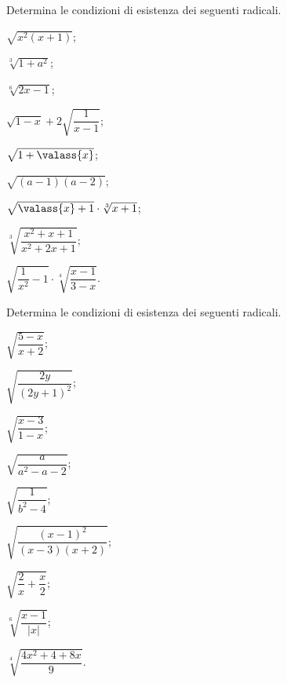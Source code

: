 \begin{esercizio}[\Ast]
 \label{ese:2.12}
Determina le condizioni di esistenza dei seguenti radicali.
 \begin{multicols}{3}
 \begin{enumeratea}
 \item $\sqrt{x^2(x+1)}$;
 \item $\sqrt[3]{1+a^2}$;
 \item $\sqrt[6]{2x-1}$;
 \item $\sqrt{1-x}+2\sqrt{\dfrac 1{x-1}}$;
 \item $\sqrt{1+\valass{x}}$;
 \item $\sqrt{(a-1)(a-2)}$;
 \item $\sqrt{\valass{x}+1}\cdot \sqrt[3]{x+1}$;
 \item $\sqrt[3]{\dfrac{x^2+x+1}{x^2+2x+1}}$;
 \item $\sqrt{\dfrac 1{x^2}-1}\cdot \sqrt[4]{\dfrac{x-1}{3-x}}$.
 \end{enumeratea}
 \end{multicols}
\end{esercizio}

\begin{esercizio}[\Ast]
 \label{ese:2.13}
Determina le condizioni di esistenza dei seguenti radicali.
 \begin{multicols}{3}
 \begin{enumeratea}
 \item $\sqrt{\dfrac{5-x}{x+2}}$;
 \item $\sqrt{\dfrac{2y}{(2y+1)^2}}$;
 \item $\sqrt{\dfrac{x-3}{1-x}}$;
 \item $\sqrt{\dfrac a{a^2-a-2}}$;
 \item $\sqrt{\dfrac 1{b^2-4}}$;
 \item $\sqrt{\dfrac{(x-1)^2}{(x-3)(x+2)}}$;
 \item $\sqrt{\dfrac 2 x+\dfrac x 2}$;
 \item $\sqrt[6]{\dfrac{x-1}{\left|x\right|}}$;
 \item $\sqrt[4]{\dfrac{4x^2+4+8x} 9}$.
 \end{enumeratea}
 \end{multicols}
\end{esercizio}

